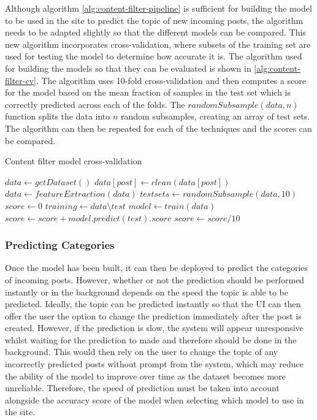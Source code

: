 Although algorithm \ref{alg:content-filter-pipeline} is sufficient for building the model to be used in the site to predict the topic of new incoming posts, the algorithm needs to be adapted slightly so that the different models can be compared. This new algorithm incorporates cross-validation, where subsets of the training set are used for testing the model to determine how accurate it is. The algorithm used for building the models so that they can be evaluated is shown in \ref{alg:content-filter-cv}. The algorithm uses 10-fold cross-validation and then computes a score for the model based on the mean fraction of samples in the test set which is correctly predicted across each of the folds. The $randomSubsample(data,n)$ function splits the data into $n$ random subsamples, creating an array of test sets. The algorithm can then be repeated for each of the techniques and the scores can be compared.

\begin{algorithm}
\caption{Content filter model cross-validation}
\label{alg:content-filter-cv}
\begin{algorithmic}[1]
\State $data\gets getDataset()$
	\State $data[post]\gets clean(data[post])$
\EndFor
\State $data\gets featureExtraction(data)$
\State $testsets\gets randomSubsample(data, 10)$
\State $score\gets 0$
	\State $training\gets data\setminus test$
	\State $model\gets train(data)$
	\State $score\gets score + model.predict(test).score$
\EndFor
\State $score\gets score/10$
\end{algorithmic}
\end{algorithm}

\subsubsection{Predicting Categories}
Once the model has been built, it can then be deployed to predict the categories of incoming posts. However, whether or not the prediction should be performed instantly or in the background depends on the speed the topic is able to be predicted. Ideally, the topic can be predicted instantly so that the UI can then offer the user the option to change the prediction immediately after the post is created. However, if the prediction is slow, the system will appear unresponsive whilst waiting for the prediction to made and therefore should be done in the background. This would then rely on the user to change the topic of any incorrectly predicted posts without prompt from the system, which may reduce the ability of the model to improve over time as the dataset becomes more unreliable. Therefore, the speed of prediction must be taken into account alongside the accuracy score of the model when selecting which model to use in the site.

